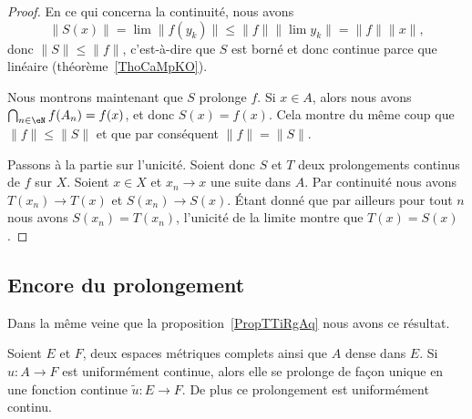\begin{proof}
	En ce qui concerna la continuité, nous avons
	\begin{equation}
		\| S(x) \|=\lim\| f(y_k) \|\leq \| f \|\| \lim y_k \|=\| f \|\| x \|,
	\end{equation}
	donc \( \| S \|\leq \| f \|\), c'est-à-dire que \( S\) est borné et donc continue parce que linéaire (théorème~\ref{ThoCaMpKO}).

	Nous montrons maintenant que \( S\) prolonge \( f\). Si \( x\in A\), alors nous avons \( \bigcap_{n\in \eN}f(A_n)=f(x)\), et donc \( S(x)=f(x)\). Cela montre du même coup que \( \| f \|\leq \| S \|\) et que par conséquent \( \| f \|=\| S \|\).

	Passons à la partie sur l'unicité. Soient donc \( S\) et \( T\)  deux prolongements continus de \( f\) sur \( X\). Soient \( x\in X\) et \( x_n\to x\) une suite dans \( A\). Par continuité nous avons \( T(x_n)\to T(x)\) et \( S(x_n)\to S(x)\). Étant donné que par ailleurs pour tout \( n\) nous avons \( S(x_n)=T(x_n)\), l'unicité de la limite montre que \( T(x)=S(x)\).
\end{proof}

\subsection{Encore du prolongement}

Dans la même veine que la proposition~\ref{PropTTiRgAq} nous avons ce résultat.
\begin{theorem}      \label{ThoPVFQMi}
	Soient \( E\) et \( F\), deux espaces métriques complets ainsi que \( A\) dense dans \( E\). Si \( u\colon A\to F\) est uniformément continue, alors elle se prolonge de façon unique en une fonction continue \( \tilde u\colon E\to F\). De plus ce prolongement est uniformément continu.
\end{theorem}

